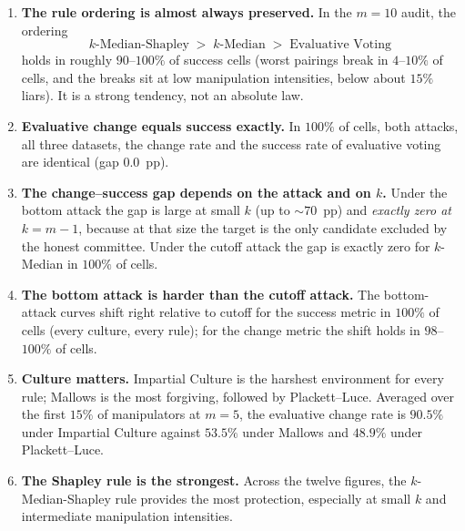 \documentclass[11pt,a4paper]{article}
\begin{document}
\begin{enumerate}
  \item \textbf{The rule ordering is almost always preserved.}
        In the \(m = 10\) audit, the ordering
        \[
          k\text{-Median-Shapley}
          \;>\;
          k\text{-Median}
          \;>\;
          \text{Evaluative Voting}
        \]
        holds in roughly \(90\)--\(100\%\) of success cells (worst pairings
        break in \(4\)--\(10\%\) of cells, and the breaks sit at low
        manipulation intensities, below about \(15\%\) liars). It is a strong
        tendency, not an absolute law.

  \item \textbf{Evaluative change equals success exactly.} In \(100\%\) of
        cells, both attacks, all three datasets, the change rate and the
        success rate of evaluative voting are identical (gap \(0.0\)~pp).

  \item \textbf{The change--success gap depends on the attack and on \(k\).}
        Under the bottom attack the gap is large at small \(k\) (up to
        \(\sim70\)~pp) and \emph{exactly zero at \(k = m-1\)}, because at
        that size the target is the only candidate excluded by the honest
        committee. Under the cutoff attack the gap is exactly zero for
        \(k\)-Median in \(100\%\) of cells.

  \item \textbf{The bottom attack is harder than the cutoff attack.} The
        bottom-attack curves shift right relative to cutoff for the success
        metric in \(100\%\) of cells (every culture, every rule); for the
        change metric the shift holds in \(98\)--\(100\%\) of cells.

  \item \textbf{Culture matters.} Impartial Culture is the harshest
        environment for every rule; Mallows is the most forgiving, followed
        by Plackett--Luce. Averaged over the first \(15\%\) of manipulators at
        \(m = 5\), the evaluative change rate is \(90.5\%\) under Impartial
        Culture against \(53.5\%\) under Mallows and \(48.9\%\) under
        Plackett--Luce.

  \item \textbf{The Shapley rule is the strongest.} Across the twelve
        figures, the \(k\)-Median-Shapley rule provides the most protection,
        especially at small \(k\) and intermediate manipulation intensities.
\end{enumerate}
\end{document}
